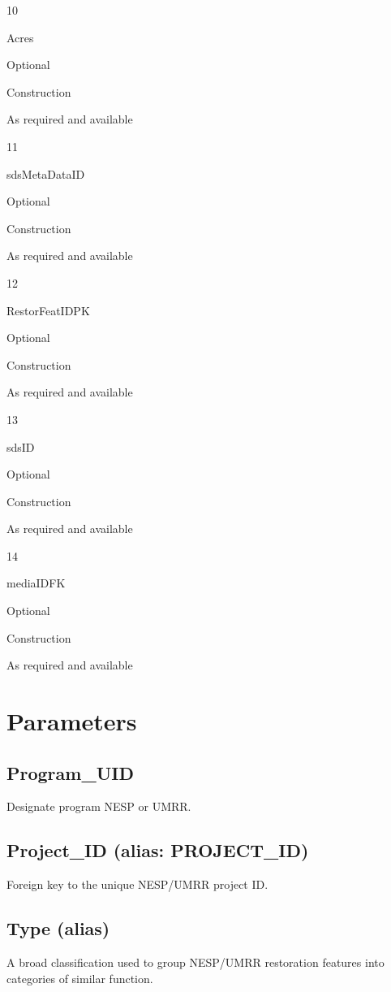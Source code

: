 \documentclass[
  letterpaper,
  DIV=11,
  numbers=noendperiod]{scrreprt}
\begin{document}
10

Acres

Optional

Construction

As required and available

11

sdsMetaDataID

Optional

Construction

As required and available

12

RestorFeatIDPK

Optional

Construction

As required and available

13

sdsID

Optional

Construction

As required and available

14

mediaIDFK

Optional

Construction

As required and available

\section{Parameters}\label{parameters-17}

\subsection{Program\_UID}\label{program_uid-17}

Designate program NESP or UMRR.

\subsection{Project\_ID (alias:
PROJECT\_ID)}\label{project_id-alias-project_id-17}

Foreign key to the unique NESP/UMRR project ID.

\subsection{Type (alias)}\label{type-alias-16}

A broad classification used to group NESP/UMRR restoration features into
categories of similar function.
\end{document}
